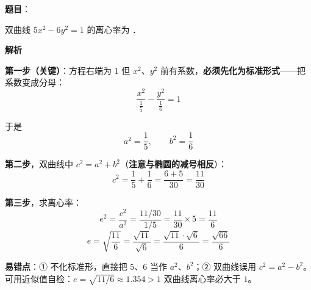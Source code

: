 \begin{answer}

\textbf{题目}：

双曲线 $5x^2-6y^2=1$ 的离心率为 \gkblank{}．

\textbf{解析}

\textbf{第一步（关键）}：方程右端为 $1$ 但 $x^2$、$y^2$ 前有系数，\textbf{必须先化为标准形式}——把系数变成分母：
\nopagebreak[4]
\[\frac{x^2}{\frac15}-\frac{y^2}{\frac16}=1\]

于是
\nopagebreak[4]
\[a^2=\frac15,\qquad b^2=\frac16\]

\textbf{第二步}，双曲线中 $c^2=a^2+b^2$（\textbf{注意与椭圆的减号相反}）：
\nopagebreak[4]
\[c^2=\frac15+\frac16=\frac{6+5}{30}=\frac{11}{30}\]

\textbf{第三步}，求离心率：
\nopagebreak[4]
\[e^2=\frac{c^2}{a^2}=\frac{11/30}{1/5}=\frac{11}{30}\times 5=\frac{11}{6}\]
\nopagebreak[4]
\[e=\sqrt{\frac{11}{6}}=\frac{\sqrt{11}}{\sqrt6}=\frac{\sqrt{11}\cdot\sqrt6}{6}=\frac{\sqrt{66}}{6}\]

\begin{gktip}
\textbf{易错点}：① 不化标准形，直接把 $5$、$6$ 当作 $a^2$、$b^2$；② 双曲线误用 $c^2=a^2-b^2$。可用近似值自检：$e=\sqrt{11/6}\approx1.354>1$  双曲线离心率必大于 $1$。
\end{gktip}


\par\medskip

\end{answer}
